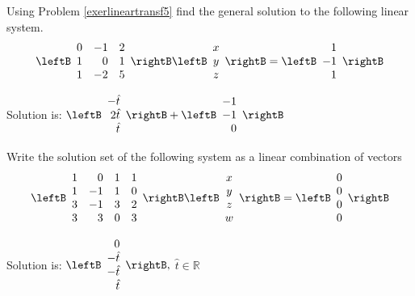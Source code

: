 \begin{enumialphparenastyle}
\begin{ex} Using Problem \ref{exerlineartransf5} find the general solution to the
following linear system.
\begin{equation*}
\leftB
\begin{array}{rrr}
0 & -1 & 2 \\
1 & 0 & 1 \\
1 & -2 & 5
\end{array}
\rightB \leftB
\begin{array}{c}
x \\
y \\
z
\end{array}
\rightB =\leftB
\begin{array}{r}
1 \\
-1 \\
1
\end{array}
\rightB 
\end{equation*}
\begin{sol}
Solution is: $\leftB
\begin{array}{r}
-\hat{t} \\
2\hat{t} \\
\hat{t}
\end{array}
\rightB +\leftB
\begin{array}{r}
-1 \\
-1 \\
0
\end{array}
\rightB $
\end{sol}
\end{ex}

\begin{ex} \label{exerlineartransf6}Write the solution set of the following system as a linear combination of vectors
\begin{equation*}
\leftB
\begin{array}{rrrr}
1 & 0 & 1 & 1 \\
1 & -1 & 1 & 0 \\
3 & -1 & 3 & 2 \\
3 & 3 & 0 & 3
\end{array}
\rightB \leftB
\begin{array}{c}
x \\
y \\
z \\
w
\end{array}
\rightB =\leftB
\begin{array}{r}
0 \\
0 \\
0 \\
0
\end{array}
\rightB 
\end{equation*}
\begin{sol}
Solution is: $\leftB
\begin{array}{r}
0 \\
-\hat{t} \\
-\hat{t} \\
\hat{t}
\end{array}
\rightB ,$ $\hat{t}\in \mathbb{R}$
\end{sol}
\end{ex}


\end{enumialphparenastyle}
